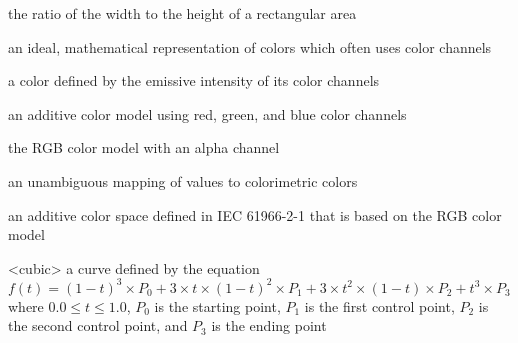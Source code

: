 the ratio of the width to the height of a rectangular area

an ideal, mathematical representation of colors which often uses color channels

a color defined by the emissive intensity of its color channels

an additive color model using red, green, and blue color channels

the RGB color model with an alpha channel

an unambiguous mapping of values to colorimetric colors

an additive color space defined in IEC 61966-2-1 that is based on the RGB color model

%
%
<cubic> a curve defined by the 
equation $f(t) = (1 - t)^{3} \times P_{0} + 3 \times t \times (1 - t)^{2} 
\times P_{1} + 3 \times t^{2} \times (1 - t) \times P_{2} + t^{3} \times P_{3}$ 
where $0.0 \le t \le 1.0$, $P_{0}$ is the starting point, $P_{1}$ is the first 
control point, $P_{2}$ is the second control point, and $P_{3}$ is the 
ending point


